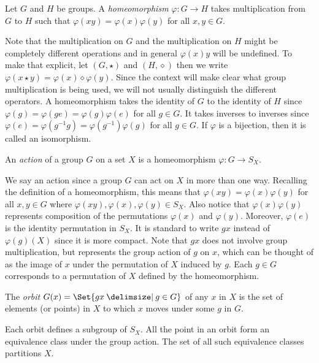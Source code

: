 \begin{definition}
Let $G$ and $H$ be groups.  A \emph{homeomorphism} $\varphi: G \to H$ takes multiplication
from $G$ to $H$ such that $\varphi(xy) = \varphi(x)\varphi(y)$ for all $x, y \in G$.
\end{definition}

Note that the multiplication on $G$ and the multiplication on $H$ might be completely different operations
and in general $\varphi(x)y$ will be undefined.
To make that explicit, let $(G, \star)$ and $(H, \diamond)$ then we write 
$\varphi(x \star y) = \varphi(x)  \diamond \varphi(y)$.  
Since the context will make clear what group multiplication is being used, we will not usually
distinguish the different  operators.
A homeomorphism takes the identity of $G$ to the identity of $H$
since $\varphi(g) = \varphi(ge) = \varphi(g)\varphi(e)$ for all $g \in G$. It takes inverses to 
inverses since $\varphi(e) = \varphi(g^{-1}g) = \varphi(g^{-1})\varphi(g)$ for all $g \in G$.
If $\varphi$ is a bijection, then it is called an isomorphism.

\begin{definition}
An \emph{action} of a group $G$ on a set $X$ is a homeomorphism $\varphi: G \to S_X$.
\end{definition}

We say an action since a group $G$ can act on $X$ in more than one way. Recalling the
definition of a homeomorphism, this means that $\varphi(xy) = \varphi(x)\varphi(y)$ for all
$x, y \in G$ where $\varphi(xy), \varphi(x), \varphi(y) \in S_X$.  Also notice that
$\varphi(x)\varphi(y)$ represents composition of the permutations $\varphi(x)$ and 
$\varphi(y)$.  Moreover, $\varphi(e)$ is the identity permutation in $S_X$.
It is standard to write $gx$ instead of $\varphi(g)(X)$ since it is more compact.
Note that $gx$ does not involve group multiplication, but represents the group action
of $g$ on $x$, which can be thought of as the image of $x$ under the permutation of $X$
induced by $g$.  Each $g \in G$ corresponds to a permutation of $X$ defined by the
homeomorphism.

%
%



\begin{definition}
The \emph{orbit} $G(x) = \Set{gx  \given g \in G}$ of any $x$ in $X$ is
the set of elements (or points) in $X$ to which $x$ moves under some $g$ in $G$.
\end{definition}

Each orbit defines a subgroup of $S_X$.  All the point in an orbit form an equivalence
class under the group action.  The set of all such equivalence classes partitions $X$.
